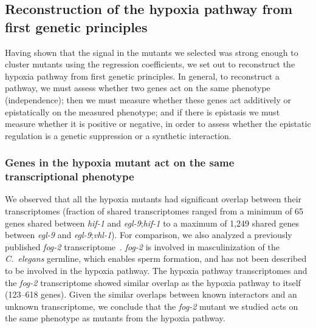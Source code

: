 \documentclass[9pt,twocolumn,twoside]{pnas-new}
\newcommand{\cel}{\emph{C.~elegans}}
\newcommand{\egl}{\emph{egl-9}}
\newcommand{\vhl}{\emph{vhl-1}}
\newcommand{\hif}{\emph{hif-1}}
\newcommand{\fog}{\emph{fog-2}}
\begin{document}
\subsection*{Reconstruction of the hypoxia pathway from first genetic principles}
\label{sec:reconstruct}
Having shown that the signal in the mutants we selected was strong enough to
cluster mutants using the regression coefficients, we set out to reconstruct the
hypoxia pathway from first genetic principles. In general, to reconstruct a pathway,
we must assess whether two genes act on the same phenotype (independence);
then we must measure whether these genes act additively or epistatically on the
measured phenotype; and if there is epistasis we must measure whether it is positive
or negative, in order to assess whether the epistatic regulation is a genetic
suppression or a synthetic interaction.

\subsubsection{Genes in the hypoxia mutant act on the same transcriptional phenotype}
\label{sec:phenotypes}
We observed that all the hypoxia mutants had significant overlap between their
transcriptomes (fraction of shared transcriptomes ranged from a minimum of 65 genes
shared between \hif{} and \egl{};\hif{} to a maximum of 1,249 shared genes between
\egl{} and \egl{};\vhl{}). For comparison, we also analyzed a previously published
\fog{} transcriptome~\cite{Angeles-Albores2016a}. \fog{} is involved in masculinization
of the \cel{} germline, which enables sperm formation, and has not been described
to be involved in the hypoxia pathway. The hypoxia pathway transcriptomes
and the \fog{} transcriptome showed similar overlap as the hypoxia pathway to itself
(123--618 genes). Given the similar overlaps between known interactors and an unknown
transcriptome, we conclude that the \fog{} mutant we studied acts on the same
phenotype as mutants from the hypoxia pathway.
\end{document}
